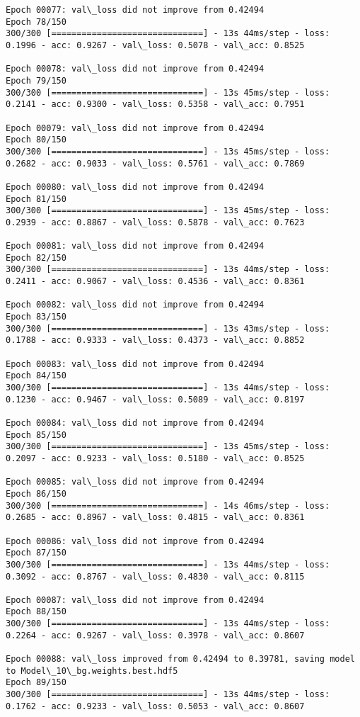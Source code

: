 \documentclass[11pt]{article}
\begin{document}
\begin{Verbatim}[commandchars=\\\{\}]
Epoch 00077: val\_loss did not improve from 0.42494
Epoch 78/150
300/300 [==============================] - 13s 44ms/step - loss: 0.1996 - acc: 0.9267 - val\_loss: 0.5078 - val\_acc: 0.8525

Epoch 00078: val\_loss did not improve from 0.42494
Epoch 79/150
300/300 [==============================] - 13s 45ms/step - loss: 0.2141 - acc: 0.9300 - val\_loss: 0.5358 - val\_acc: 0.7951

Epoch 00079: val\_loss did not improve from 0.42494
Epoch 80/150
300/300 [==============================] - 13s 45ms/step - loss: 0.2682 - acc: 0.9033 - val\_loss: 0.5761 - val\_acc: 0.7869

Epoch 00080: val\_loss did not improve from 0.42494
Epoch 81/150
300/300 [==============================] - 13s 45ms/step - loss: 0.2939 - acc: 0.8867 - val\_loss: 0.5878 - val\_acc: 0.7623

Epoch 00081: val\_loss did not improve from 0.42494
Epoch 82/150
300/300 [==============================] - 13s 44ms/step - loss: 0.2411 - acc: 0.9067 - val\_loss: 0.4536 - val\_acc: 0.8361

Epoch 00082: val\_loss did not improve from 0.42494
Epoch 83/150
300/300 [==============================] - 13s 43ms/step - loss: 0.1788 - acc: 0.9333 - val\_loss: 0.4373 - val\_acc: 0.8852

Epoch 00083: val\_loss did not improve from 0.42494
Epoch 84/150
300/300 [==============================] - 13s 44ms/step - loss: 0.1230 - acc: 0.9467 - val\_loss: 0.5089 - val\_acc: 0.8197

Epoch 00084: val\_loss did not improve from 0.42494
Epoch 85/150
300/300 [==============================] - 13s 45ms/step - loss: 0.2097 - acc: 0.9233 - val\_loss: 0.5180 - val\_acc: 0.8525

Epoch 00085: val\_loss did not improve from 0.42494
Epoch 86/150
300/300 [==============================] - 14s 46ms/step - loss: 0.2685 - acc: 0.8967 - val\_loss: 0.4815 - val\_acc: 0.8361

Epoch 00086: val\_loss did not improve from 0.42494
Epoch 87/150
300/300 [==============================] - 13s 44ms/step - loss: 0.3092 - acc: 0.8767 - val\_loss: 0.4830 - val\_acc: 0.8115

Epoch 00087: val\_loss did not improve from 0.42494
Epoch 88/150
300/300 [==============================] - 13s 44ms/step - loss: 0.2264 - acc: 0.9267 - val\_loss: 0.3978 - val\_acc: 0.8607

Epoch 00088: val\_loss improved from 0.42494 to 0.39781, saving model to Model\_10\_bg.weights.best.hdf5
Epoch 89/150
300/300 [==============================] - 13s 44ms/step - loss: 0.1762 - acc: 0.9233 - val\_loss: 0.5053 - val\_acc: 0.8607


\end{Verbatim}
\end{document}
